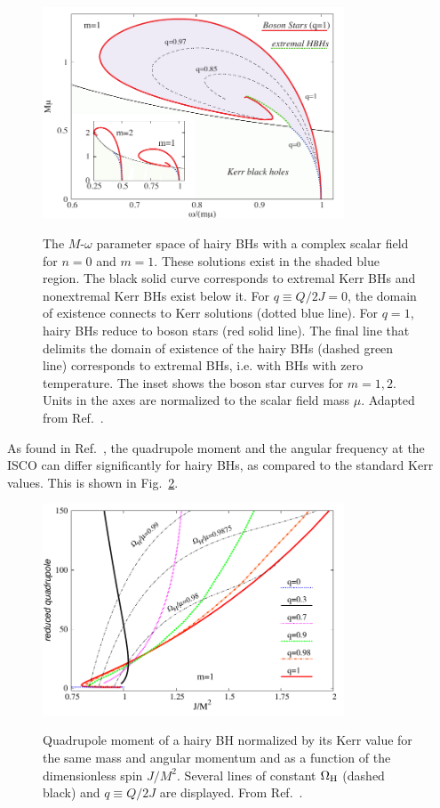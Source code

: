 \documentclass[11pt]{article}
\numberwithin{equation}{section} %
\begin{document}
%
\begin{figure}[H]
\centering
\includegraphics[width=0.8\textwidth]{BH-w-M.pdf}\\
\caption{The $M$-$\omega$ parameter space of hairy BHs with a complex scalar field for $n=0$ and $m=1$. These solutions 
exist in the shaded blue region. The black solid curve corresponds to extremal Kerr BHs and nonextremal Kerr BHs exist 
below it. For $q\equiv Q/2J=0$, the domain of existence connects to Kerr solutions (dotted blue line). For $q=1$, hairy 
BHs reduce to boson stars (red solid line). The final line that delimits the domain of existence of the hairy BHs 
(dashed green line) corresponds to extremal BHs, i.e. with BHs with zero temperature. The inset shows the boson star 
curves for $m=1,2$. Units in the axes are normalized to the scalar field mass $\mu$. Adapted from 
Ref.~\cite{Herdeiro:2014goa}.}
\label{hairy-pm}
\end{figure}
%

As found in Ref.~\cite{Herdeiro:2014goa}, the quadrupole moment and the angular frequency at the ISCO can differ 
significantly for hairy BHs, as compared to the standard Kerr
values. This is shown in Fig.~\ref{fig:hairyQ}.

%
\begin{figure}[ht]
\centering
\includegraphics[width=0.8\textwidth]{jQ-iso-q.pdf}\\
\caption{Quadrupole moment of a hairy BH normalized by its Kerr value for the same mass and angular momentum and as a 
function of the dimensionless spin $J/M^2$. Several lines of constant $\Omega_{\rm H}$ (dashed black) and $q\equiv Q/2J$ 
are displayed. From Ref.~\cite{Herdeiro:2014goa}.}
\label{fig:hairyQ}
\end{figure}
%
\end{document}
